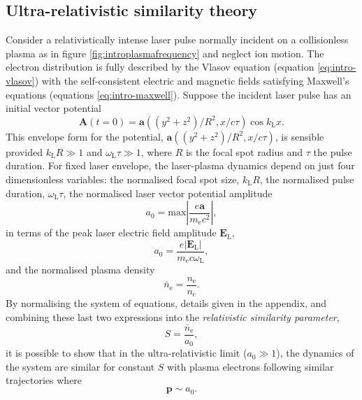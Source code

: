 \subsection{Ultra-relativistic similarity theory}
Consider a relativistically intense laser pulse normally incident on a collisionless plasma as in figure \ref{fig:introplasmafrequency} and neglect ion motion. The electron distribution is fully described by the Vlasov equation (equation \ref{eq:intro-vlasov}) with the self-consistent electric and magnetic fields satisfying Maxwell's equations (equations \ref{eq:intro-maxwell}). Suppose the incident laser pulse has an initial vector potential 
\begin{equation}
	\mathbf{A}(t=0) = \mathbf{a}((y^2+z^2)/R^2,x/c\tau)\cos k_\mathrm{L}x.
\end{equation}
This envelope form for the potential, $\mathbf{a}((y^2+z^2)/R^2,x/c\tau)$, is sensible provided $k_\mathrm{L}R \gg 1$ and $\omega_\mathrm{L}\tau \gg 1$, where $R$ is the focal spot radius and $\tau$ the pulse duration. For fixed laser envelope, the laser-plasma dynamics depend on just four dimensionless variables:  the normalised focal spot size, $k_\mathrm{L} R$, the normalised pulse duration, $\omega_\mathrm{L}\tau$, the normalised laser vector potential amplitude
\begin{equation}
	a_0 = \mathrm{max}\left|\frac{e \mathbf{a} }{m_\mathrm{e} c^2 }\right|,
\end{equation}
in terms of the peak laser electric field amplitude $\mathbf{E}_\mathrm{L}$,
\begin{equation}
	a_0 = \frac{e|\mathbf{E}_\mathrm{L}|}{m_\mathrm{e} c\omega_\mathrm{L}},
\end{equation}
and the normalised plasma density
\begin{equation}
	\bar{n}_\mathrm{e} = \frac{n_\mathrm{e}}{n_\mathrm{c}}.
\end{equation}
By normalising the system of equations, details given in the appendix, and combining these last two expressions into the \textit{relativistic similarity parameter},
\begin{equation}
	S = \frac{\bar{n}_\mathrm{e}}{a_0},
\end{equation}
it is possible to show that in the ultra-relativistic limit ($a_0 \gg 1$), the dynamics of the system are similar for constant $S$ \cite{gordienkoScalingsUltrarelativisticLaser2005} with plasma electrons following similar trajectories where 
\begin{equation}\label{eq:intro-p_similarity}
	\mathbf{p} \sim a_0.
\end{equation}
